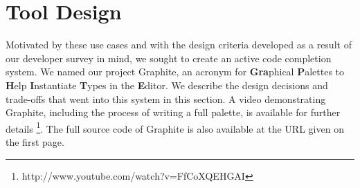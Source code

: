 \documentclass[10pt, conference, compsocconf]{IEEEtran}
\begin{document}
%
%
%
%
%
%
%
\section{Tool Design}
Motivated by these use cases and with the design criteria developed as a result of our developer survey in mind, we sought to create an active code completion system. We named our project Graphite, an acronym for {\bf Gra}phical {\bf P}alettes to {\bf H}elp {\bf I}nstantiate {\bf T}ypes in the {\bf E}ditor. We describe the design decisions and trade-offs that went into this system in this section. A video demonstrating Graphite, including the process of writing a full palette, is available for further details \footnote{http://www.youtube.com/watch?v=FfCoXQEHGAI}. The full source code of Graphite is also available at the URL given on the first page.
\end{document}
